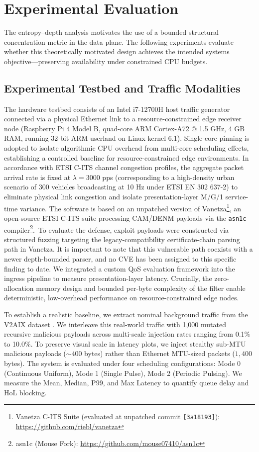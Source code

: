 \documentclass[conference]{IEEEtran}
\begin{document}
\section{Experimental Evaluation}
The entropy--depth analysis motivates the use of a bounded structural concentration metric in the data plane. The following experiments evaluate whether this theoretically motivated design achieves the intended systems objective—preserving availability under constrained CPU budgets.

\subsection{Experimental Testbed and Traffic Modalities}
The hardware testbed consists of an Intel i7-12700H host traffic generator connected via a physical Ethernet link to a resource-constrained edge receiver node (Raspberry Pi 4 Model B, quad-core ARM Cortex-A72 @ 1.5 GHz, 4 GB RAM, running 32-bit ARM userland on Linux kernel 6.1). Single-core pinning is adopted to isolate algorithmic CPU overhead from multi-core scheduling effects, establishing a controlled baseline for resource-constrained edge environments. In accordance with ETSI C-ITS channel congestion profiles, the aggregate packet arrival rate is fixed at $\lambda = 3000$ pps (corresponding to a high-density urban scenario of 300 vehicles broadcasting at 10 Hz under ETSI EN 302 637-2) to eliminate physical link congestion and isolate presentation-layer M/G/1 service-time variance. The software is based on an unpatched version of Vanetza\footnote{Vanetza C-ITS Suite (evaluated at unpatched commit \texttt{[3a18193]}): \url{https://github.com/riebl/vanetza}}, an open-source ETSI C-ITS suite processing CAM/DENM payloads via the \texttt{asn1c} compiler\footnote{asn1c (Mouse Fork): \url{https://github.com/mouse07410/asn1c}}.~To evaluate the defense, exploit payloads were constructed via structured fuzzing targeting the legacy-compatibility certificate-chain parsing path in Vanetza. It is important to note that this vulnerable path coexists with a newer depth-bounded parser, and no CVE has been assigned to this specific finding to date. We integrated a custom QoS evaluation framework into the ingress pipeline to measure presentation-layer latency. Crucially, the zero-allocation memory design and bounded per-byte complexity of the filter enable deterministic, low-overhead performance on resource-constrained edge nodes.

To establish a realistic baseline, we extract nominal background traffic from the V2AIX dataset \cite{10920150}. We interleave this real-world traffic with 1,000 mutated recursive malicious payloads across multi-scale injection rates ranging from 0.1\% to 10.0\%. To preserve visual scale in latency plots, we inject stealthy sub-MTU malicious payloads ($\sim400$ bytes) rather than Ethernet MTU-sized packets ($1,400$ bytes). The system is evaluated under four scheduling configurations: Mode 0 (Continuous Uniform), Mode 1 (Single Pulse), Mode 2 (Periodic Pulsing). We measure the Mean, Median, P99, and Max Latency to quantify queue delay and HoL blocking.
\end{document}
